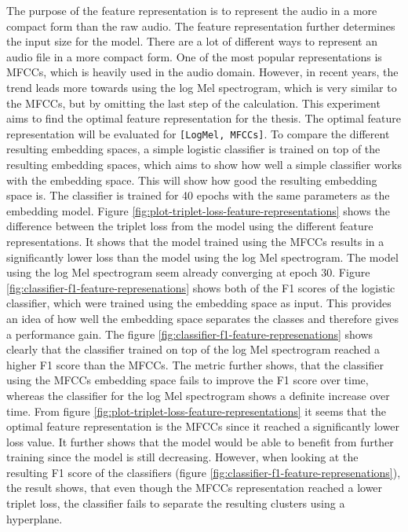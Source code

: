 \noindent
The purpose of the feature representation is to represent the audio in a more compact form than the raw audio. The feature representation further determines the input size for the model. There are a lot of different ways to represent an audio file in a more compact form. One of the most popular representations is \glspl{MFCC}, which is heavily used in the audio domain. However, in recent years, the trend leads more towards using the log Mel spectrogram, which is very similar to the \glspl{MFCC}, but by omitting the last step of the calculation. This experiment aims to find the optimal feature representation for the thesis. The optimal feature representation will be evaluated for \texttt{[LogMel, MFCCs]}.
\newline
\newline
To compare the different resulting embedding spaces, a simple logistic classifier is trained on top of the resulting embedding spaces, which aims to show how well a simple classifier works with the embedding space. This will show how good the resulting embedding space is. The classifier is trained for 40 epochs with the same parameters as the embedding model.
\newline
\newline
Figure \ref{fig:plot-triplet-loss-feature-representations} shows the difference between the triplet loss from the model using the different feature representations. It shows that the model trained using the \glspl{MFCC} results in a significantly lower loss than the model using the log Mel spectrogram. The model using the log Mel spectrogram seem already converging at epoch 30.
\newline
\newline
Figure \ref{fig:classifier-f1-feature-represenations} shows both of the F1 scores of the logistic classifier, which were trained using the embedding space as input. This provides an idea of how well the embedding space separates the classes and therefore gives a performance gain. The figure \ref{fig:classifier-f1-feature-represenations} shows clearly that the classifier trained on top of the log Mel spectrogram reached a higher F1 score than the \glspl{MFCC}. The metric further shows, that the classifier using the \glspl{MFCC} embedding space fails to improve the F1 score over time, whereas the classifier for the log Mel spectrogram shows a definite increase over time.
\newline
\newline
From figure \ref{fig:plot-triplet-loss-feature-representations} it seems that the optimal feature representation is the \glspl{MFCC} since it reached a significantly lower loss value. It further shows that the model would be able to benefit from further training since the model is still decreasing. However, when looking at the resulting F1 score of the classifiers (figure \ref{fig:classifier-f1-feature-represenations}), the result shows, that even though the \glspl{MFCC} representation reached a lower triplet loss, the classifier fails to separate the resulting clusters using a hyperplane. 
